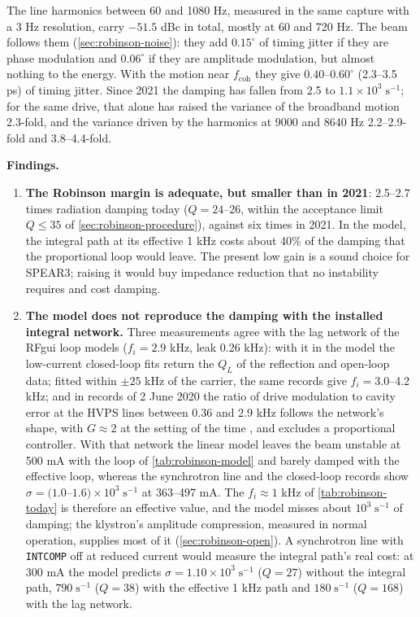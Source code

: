 The line harmonics between 60 and 1080 Hz, measured in the same capture with a 3 Hz resolution, carry \(-51.5\) dBc in total, mostly at 60 and 720 Hz. The beam follows them (\cref{sec:robinson-noise}): they add \(0.15^\circ\) of timing jitter if they are phase modulation and \(0.06^\circ\) if they are amplitude modulation, but almost nothing to the energy. With the motion near \(f_\text{coh}\) they give \(0.40\)--\(0.60^\circ\) (2.3--3.5 ps) of timing jitter. Since 2021 the damping has fallen from 2.5 to \(1.1\times10^3\;\text{s}^{-1}\); for the same drive, that alone has raised the variance of the broadband motion 2.3-fold, and the variance driven by the harmonics at 9000 and 8640 Hz 2.2--2.9-fold and 3.8--4.4-fold.

\textbf{Findings.}

\begin{enumerate}
\item \textbf{The Robinson margin is adequate, but smaller than in 2021}: 2.5--2.7 times radiation damping today (\(Q = 24\)--26, within the acceptance limit \(Q \le 35\) of \cref{sec:robinson-procedure}), against six times in 2021. In the model, the integral path at its effective 1 kHz costs about 40\% of the damping that the proportional loop would leave. The present low gain is a sound choice for SPEAR3; raising it would buy impedance reduction that no instability requires and cost damping.
\item \textbf{The model does not reproduce the damping with the installed integral network.} Three measurements agree with the lag network of the RFgui loop models (\(f_i = 2.9\) kHz, leak 0.26 kHz): with it in the model the low-current closed-loop fits return the \(Q_L\) of the reflection and open-loop data; fitted within \(\pm 25\) kHz of the carrier, the same records give \(f_i = 3.0\)--4.2 kHz; and in records of 2 June 2020 the ratio of drive modulation to cavity error at the HVPS lines between 0.36 and 2.9 kHz follows the network's shape, with \(G \approx 2\) at the setting of the time , and excludes a proportional controller. With that network the linear model leaves the beam unstable at 500 mA with the loop of \cref{tab:robinson-model} and barely damped with the effective loop, whereas the synchrotron line and the closed-loop records show \(\sigma = (1.0\)--\(1.6)\times10^3\;\text{s}^{-1}\) at 363--497 mA. The \(f_i \approx 1\) kHz of \cref{tab:robinson-today} is therefore an effective value, and the model misses about \(10^3\;\text{s}^{-1}\) of damping; the klystron's amplitude compression, measured in normal operation, supplies most of it (\cref{sec:robinson-open}). A synchrotron line with \texttt{INTCOMP} off at reduced current would measure the integral path's real cost: at 300 mA the model predicts \(\sigma = 1.10\times10^3\;\text{s}^{-1}\) (\(Q = 27\)) without the integral path, \(790\;\text{s}^{-1}\) (\(Q = 38\)) with the effective 1 kHz path and \(180\;\text{s}^{-1}\) (\(Q = 168\)) with the lag network.

\end{enumerate}
